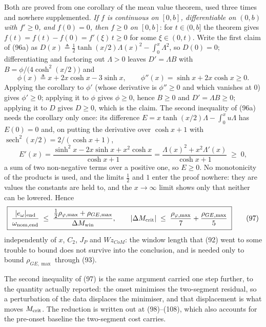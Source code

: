 \documentclass[10pt]{article}
\newcommand{\Wz}{W\!z_{CoM}}
\begin{document}
Both are proved from one corollary of the mean value theorem, used
three times and nowhere supplemented. \emph{If $f$ is continuous on
$[0,b]$, differentiable on $(0,b)$ with $f'\ge0$, and $f(0)=0$, then
$f\ge0$ on $[0,b]$}: for $t\in(0,b]$ the theorem gives
$f(t) = f(t)-f(0) = f'(\xi)\,t \ge 0$ for some $\xi\in(0,t)$. Write
the first claim of (96a) as $D(x) \triangleq \tfrac12\tanh(x/2)
\Lambda(x)^2 - \int_0^x\Lambda^2$, so $D(0)=0$; differentiating and
factoring out $\Lambda>0$ leaves $D' = \Lambda B$ with $B =
\phi/\bigl(4\cosh^2(x/2)\bigr)$ and
\begin{equation}
  \phi(x) \triangleq x + 2x\cosh x - 3\sinh x ,
  \qquad
  \phi''(x) = \sinh x + 2x\cosh x \ge 0 .
  \tag{96b}
\end{equation}
Applying the corollary to $\phi'$ (whose derivative is $\phi''\ge0$
and which vanishes at $0$) gives $\phi'\ge0$; applying it to $\phi$
gives $\phi\ge0$, hence $B\ge0$ and $D' = \Lambda B\ge0$; applying it
to $D$ gives $D\ge0$, which is the claim. The second inequality of
(96a) needs the corollary only once: its difference $E = x\tanh(x/2)
\Lambda - \int_0^x\!u\Lambda$ has $E(0) = 0$ and, on putting the
derivative over $\cosh x + 1$ with $\operatorname{sech}^2(x/2) =
2/(\cosh x+1)$,
\begin{equation}
  E'(x) = \frac{\sinh^2x - 2x\sinh x + x^2\cosh x}{\cosh x + 1}
        = \frac{\Lambda(x)^2 + x^2\Lambda'(x)}{\cosh x + 1} \;\ge\; 0 ,
  \tag{96c}
\end{equation}
a sum of two non-negative terms over a positive one, so $E\ge0$. No
monotonicity
of the products is used, and the limits $\tfrac12$ and $1$ enter the
proof nowhere: they are values the constants are held to, and the
$x\to\infty$ limit shows only that neither can be lowered. Hence
\begin{equation}
  \boxed{\;\frac{|e_\omega|_{\rm end}}{\omega_{\rm nom,end}}
  \;\le\; \frac{\tfrac12\rho_{\varphi,\max} + \rho_{GE,\max}}
               {\Delta M_{\rm win}},
  \qquad
  |\Delta M_{\rm crit}| \;\le\; \frac{\rho_{\varphi,\max}}{7}
                              + \frac{\rho_{GE,\max}}{5}\;}
  \tag{97}
\end{equation}
independently of $x$, $C_2$, $J_P$ and $\Wz$: the window length that
(92) went to some trouble to bound does not survive into the
conclusion, and is needed only to bound $\rho_{GE,\max}$ through (93).

The second inequality of (97) is the same argument carried one step
further, to the quantity actually reported: the onset minimises the
two-segment residual, so a perturbation of the data displaces the
minimiser, and that displacement is what moves $M_{\rm crit}$. The
reduction is written out at (98)--(108), which also accounts for the
pre-onset baseline the two-segment cost carries.
\end{document}
